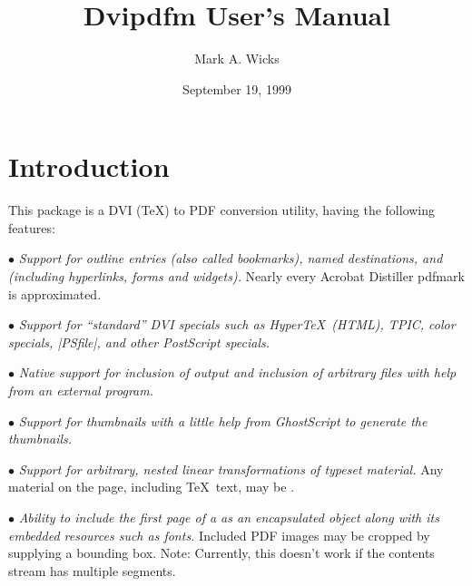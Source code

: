%
\def\display#1{\medskip\line{\quad #1\hfil}\medskip}
\def\example{\medskip\noindent{\it Example:\quad}\nobreak}
\def\note{\medskip\noindent{\it Note:\quad\nobreak}}
\def\syntax{\medskip\noindent{\it Syntax:\quad}\nobreak}
\def\description{\medskip\noindent{\it Description:\quad}\nobreak}
%
\def\newpage{\vfill\eject}
%
\def\dvipdfm{{\tt dvipdfm}}%
%
\title{Dvipdfm User's Manual}
\author{Mark A. Wicks}
\date{September 19, 1999}
\maketitle
\section{Introduction}
This package is a DVI (\TeX) to PDF conversion utility,
having the following features:

\beginlist
\item{$\bullet$} {\it Support for outline entries (also called bookmarks), named destinations,
and  (including hyperlinks, forms and widgets).}  Nearly
every Acrobat Distiller pdfmark is approximated.

\item{$\bullet$} {\it Support for ``standard'' DVI specials such
as Hyper\TeX\ (HTML), TPIC, color specials, |PSfile|, and other PostScript specials.}

\item{$\bullet$} {\it Native support for inclusion of
 output and
inclusion of arbitrary  files with help from an external program.}

\item{$\bullet$} {\it Support for thumbnails with a little help from GhostScript to
generate the thumbnails.}

\item{$\bullet$} {\it Support for arbitrary, nested linear transformations
of typeset material.}  Any material on the page, including
\TeX\ text, may be .

\item{$\bullet$} {\it Ability to include the first page of a  as
an encapsulated object along with its embedded resources such as fonts.}
Included PDF images may be cropped by supplying a bounding box.
Note:  Currently, this doesn't work if the contents stream
has multiple segments. 

